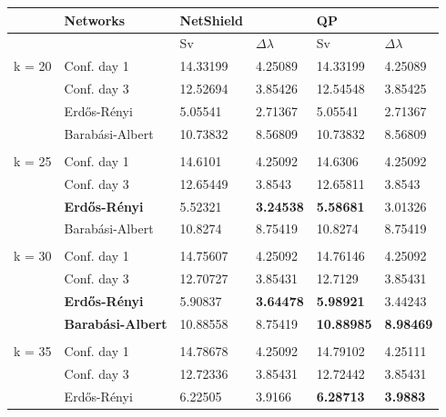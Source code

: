\documentclass[11pt]{article}
\theoremstyle{definition}
\begin{document}
\begin{table}
\begin{center}
        \begin{tabular}{ | l | l | l | l | l | l |}
        \hline
                & Networks & NetShield & & QP &  \\ \hline
                & & Sv & $\Delta\lambda$ & Sv & $\Delta\lambda$ \\ \hline
                k = 20 & Conf. day 1 & 14.33199 & 4.25089 & 14.33199 & 4.25089 \\ \hline
                & Conf. day 3 & 12.52694 & 3.85426 & 12.54548 & 3.85425 \\ \hline
                & Erd\H{o}s-R\'enyi & 5.05541 & 2.71367 & 5.05541 & 2.71367 \\ \hline
                & Barab\'asi-Albert & 10.73832 & 8.56809 & 10.73832 & 8.56809 \\ \hline
                & & & & & \\ \hline
                k = 25 & Conf. day 1 & 14.6101 & 4.25092 & 14.6306 & 4.25092 \\ \hline
                & Conf. day 3 & 12.65449 & 3.8543 & 12.65811 & 3.8543 \\ \hline
                & \textbf{Erd\H{o}s-R\'enyi} & 5.52321 & \textbf{3.24538} & \textbf{5.58681} & 3.01326 \\ \hline
                & Barab\'asi-Albert & 10.8274 & 8.75419 & 10.8274 & 8.75419 \\ \hline
                & & & & & \\ \hline
                k = 30 & Conf. day 1 & 14.75607 & 4.25092 & 14.76146 & 4.25092 \\ \hline
                & Conf. day 3 & 12.70727 & 3.85431 & 12.7129 & 3.85431 \\ \hline
                & \textbf{Erd\H{o}s-R\'enyi} & 5.90837 & \textbf{3.64478} & \textbf{5.98921} & 3.44243 \\ \hline
                & \textbf{Barab\'asi-Albert} & 10.88558 & 8.75419 & \textbf{10.88985} & \textbf{8.98469} \\ \hline
                & & & & & \\ \hline
                k = 35 & Conf. day 1 & 14.78678 & 4.25092 & 14.79102 & 4.25111 \\ \hline
                & Conf. day 3 & 12.72336 & 3.85431 & 12.72442 & 3.85431 \\ \hline
                & Erd\H{o}s-R\'enyi & 6.22505 & 3.9166 & \textbf{6.28713} & \textbf{3.9883} \\ \hline

\end{tabular}
\end{center}
\end{table}
\end{document}
